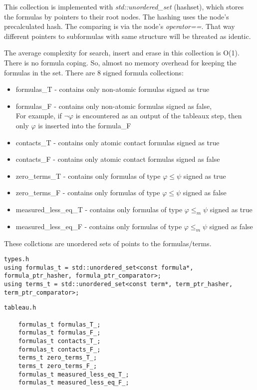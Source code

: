 \documentclass{article}
\begin{document}
	This collection is implemented with \textit{std::unordered\_set} (hashset), which stores the formulas by pointers to their root nodes. The hashing uses the node's precalculated hash. The comparing is via the node's \textit{operator==}. That way different pointers to subformulas with same structure will be threated as identic.

	The average complexity for search, insert and erase in this collection is O(1). There is no formula coping. So, almost no memory overhead for keeping the formulas in the set.
	\newline
	\newline
	There are 8 signed formula collections:
	\begin{itemize}
		\item formulas\_T - contains only non-atomic formulas signed as true
		\item formulas\_F - contains only non-atomic formulas signed as false, \\
				For example, if $\neg\varphi$ is encountered as an output of the tableaux step, then only $\varphi$ is inserted into the formula\_F
		\item contacts\_T - contains only atomic contact formulas signed as true
		\item contacts\_F - contains only atomic contact formulas signed as false
		\item zero\_terms\_T - contains only formulas of type $\varphi \le \psi$ signed as true
		\item zero\_terms\_F - contains only formulas of type $\varphi \le \psi$ signed as false
		\item measured\_less\_eq\_T - contains only formulas of type $\varphi \le_m \psi$ signed as true
		\item measured\_less\_eq\_F - contains only formulas of type $\varphi \le_m \psi$ signed as false
	\end{itemize}

	These collctions are unordered sets of points to the formulas/terms.

\begin{lstlisting}
types.h
using formulas_t = std::unordered_set<const formula*, formula_ptr_hasher, formula_ptr_comparator>;
using terms_t = std::unordered_set<const term*, term_ptr_hasher, term_ptr_comparator>;
\end{lstlisting}

\begin{lstlisting}
tableau.h

    formulas_t formulas_T_;
    formulas_t formulas_F_;
    formulas_t contacts_T_;
    formulas_t contacts_F_;
    terms_t zero_terms_T_;
    terms_t zero_terms_F_;
    formulas_t measured_less_eq_T_;
    formulas_t measured_less_eq_F_;
\end{lstlisting}
\end{document}
